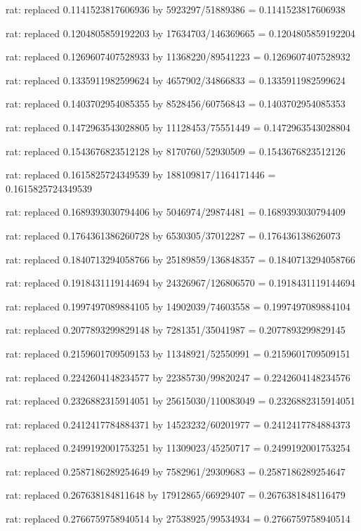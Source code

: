 \documentclass[a4paper,10pt]{article}
\begin{document}
\begin{eulernotebook}
\begin{eulercomment}
\begin{eulercomment}
\begin{eulercomment}
\begin{eulercomment}
\begin{eulercomment}
\begin{eulercomment}
\begin{eulercomment}
\begin{eulercomment}
\begin{eulercomment}
\begin{eulercomment}
\begin{eulercomment}
\begin{eulercomment}
\begin{eulercomment}
\begin{eulercomment}
\begin{eulercomment}
\begin{eulercomment}
\begin{euleroutput}
  rat: replaced 0.1141523817606936 by 5923297/51889386 = 0.1141523817606938
  
  rat: replaced 0.1204805859192203 by 17634703/146369665 = 0.1204805859192204
  
  rat: replaced 0.1269607407528933 by 11368220/89541223 = 0.1269607407528932
  
  rat: replaced 0.1335911982599624 by 4657902/34866833 = 0.1335911982599624
  
  rat: replaced 0.1403702954085355 by 8528456/60756843 = 0.1403702954085353
  
  rat: replaced 0.1472963543028805 by 11128453/75551449 = 0.1472963543028804
  
  rat: replaced 0.1543676823512128 by 8170760/52930509 = 0.1543676823512126
  
  rat: replaced 0.1615825724349539 by 188109817/1164171446 = 0.1615825724349539
  
  rat: replaced 0.1689393030794406 by 5046974/29874481 = 0.1689393030794409
  
  rat: replaced 0.1764361386260728 by 6530305/37012287 = 0.176436138626073
  
  rat: replaced 0.1840713294058766 by 25189859/136848357 = 0.1840713294058766
  
  rat: replaced 0.1918431119144694 by 24326967/126806570 = 0.1918431119144694
  
  rat: replaced 0.1997497089884105 by 14902039/74603558 = 0.1997497089884104
  
  rat: replaced 0.2077893299829148 by 7281351/35041987 = 0.2077893299829145
  
  rat: replaced 0.2159601709509153 by 11348921/52550991 = 0.2159601709509151
  
  rat: replaced 0.2242604148234577 by 22385730/99820247 = 0.2242604148234576
  
  rat: replaced 0.2326882315914051 by 25615030/110083049 = 0.2326882315914051
  
  rat: replaced 0.2412417784884371 by 14523232/60201977 = 0.2412417784884373
  
  rat: replaced 0.2499192001753251 by 11309023/45250717 = 0.2499192001753254
  
  rat: replaced 0.2587186289254649 by 7582961/29309683 = 0.2587186289254647
  
  rat: replaced 0.267638184811648 by 17912865/66929407 = 0.2676381848116479
  
  rat: replaced 0.2766759758940514 by 27538925/99534934 = 0.2766759758940514
  

\end{euleroutput}
\end{eulercomment}
\end{eulercomment}
\end{eulercomment}
\end{eulercomment}
\end{eulercomment}
\end{eulercomment}
\end{eulercomment}
\end{eulercomment}
\end{eulercomment}
\end{eulercomment}
\end{eulercomment}
\end{eulercomment}
\end{eulercomment}
\end{eulercomment}
\end{eulercomment}
\end{eulercomment}
\end{eulernotebook}
\end{document}
